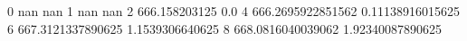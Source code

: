 0 nan nan
1 nan nan
2 666.158203125 0.0
4 666.2695922851562 0.11138916015625
6 667.3121337890625 1.1539306640625
8 668.0816040039062 1.92340087890625
